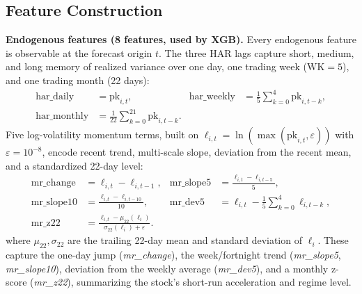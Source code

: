 \documentclass[runningheads]{llncs}
\begin{document}
\subsection{Feature Construction}
\textbf{Endogenous features (8 features, used by XGB).} Every endogenous feature is observable at the
forecast origin $t$. The three HAR lags capture short, medium, and long memory of realized variance
over one day, one trading week ($\mathrm{WK}=5$), and one trading month (22 days):
\begin{align}
\mathrm{har\_daily} &= \mathrm{pk}_{i,t}, &
\mathrm{har\_weekly} &= \frac{1}{5}\sum_{k=0}^{4}\mathrm{pk}_{i,t-k},\\
\mathrm{har\_monthly} &= \frac{1}{22}\sum_{k=0}^{21}\mathrm{pk}_{i,t-k}. &&
\end{align}
Five log-volatility momentum terms, built on $\ell_{i,t}=\ln(\max(\mathrm{pk}_{i,t},\varepsilon))$ with
$\varepsilon=10^{-8}$, encode recent trend, multi-scale slope, deviation from the recent mean, and a
standardized 22-day level:
\begin{align}
\mathrm{mr\_change} &= \ell_{i,t}-\ell_{i,t-1}, &
\mathrm{mr\_slope5} &= \frac{\ell_{i,t}-\ell_{i,t-5}}{5},\\
\mathrm{mr\_slope10} &= \frac{\ell_{i,t}-\ell_{i,t-10}}{10}, &
\mathrm{mr\_dev5} &= \ell_{i,t}-\frac{1}{5}\sum_{k=0}^{4}\ell_{i,t-k},\\
\mathrm{mr\_z22} &= \frac{\ell_{i,t}-\mu_{22}(\ell_i)}{\sigma_{22}(\ell_i)+\varepsilon}. &&
\end{align}
where $\mu_{22},\sigma_{22}$ are the trailing 22-day mean and standard deviation of $\ell_i$. These
capture the one-day jump (\emph{mr\_change}), the week/fortnight trend (\emph{mr\_slope5},
\emph{mr\_slope10}), deviation from the weekly average (\emph{mr\_dev5}), and a monthly z-score
(\emph{mr\_z22}), summarizing the stock's short-run acceleration and regime level.
\end{document}
